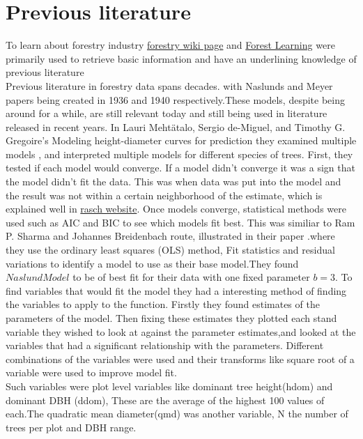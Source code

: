 \documentclass[a4paper,11pt,twoside]{report}
\begin{document}
\chapter{Previous literature}
To learn about forestry industry \href{http://wiki.awf.forst.uni-goettingen.de/wiki/index.php/Category:Forest_inventory}{forestry wiki page} and \href{http://forestlearning.edu.au/about/forest-terminology-explained.html}{Forest Learning} were primarily used to retrieve basic information and have an underlining knowledge of previous literature\\
Previous literature in forestry data spans decades. with Naslunds\cite{naslund1936skogsforsoksanstaltens} and Meyer papers\cite{meyer1940mathematical}  being created in 1936 and 1940 respectively.These models, despite being around for a while, are still relevant today and still being used in literature released in recent years. 
In Lauri Mehtätalo, Sergio de-Miguel, and Timothy G. Gregoire's Modeling height-diameter curves for prediction they examined multiple models \cite{mehtatalo2015modeling}, and interpreted multiple models for different species of trees. First, they tested if each model would converge. If a model didn’t converge it was a sign that the model didn’t fit the data. This was when data was put into the model and the result was not within a certain neighborhood of the estimate, which is explained well in \href{https://www.rasch.org/rmt/rmt11b.htm}{rasch website}.
Once models converge, statistical methods were used such as AIC and BIC to see which models fit best. This was similiar to Ram P. Sharma and Johannes Breidenbach route, illustrated in their paper \cite{doi:10.1080/21580103.2014.957354}.where they use the ordinary least squares (OLS) method, Fit statistics and residual variations to identify a model to use as their base model.They found $Naslund Model$ to be of best fit for their data with one fixed parameter $b=3$. To find variables that would fit the model they had a interesting method of finding the variables to apply to the function. Firstly they found estimates of the parameters of the model. Then fixing these estimates they plotted each stand variable they wished to look at against the parameter estimates,and looked at the variables that had a significant relationship with the parameters. Different combinations of the variables were used and their transforms like square root of a variable were used to improve model fit. \\
Such variables were plot level variables like dominant tree height(hdom) and dominant DBH (ddom), These are the average of the highest 100 values of each.The quadratic mean diameter(qmd) was another variable, N the number of trees per plot and DBH range.\\ 
\end{document}
